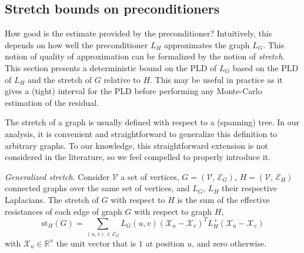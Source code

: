 


\subsection{Stretch bounds on preconditioners\label{sub:Stretch-bounds}}

How good is the estimate provided by the preconditioner? Intuitively,
this depends on how well the preconditioner $L_{H}$ approximates
the graph $L_{G}$. This notion of quality of approximation can be
formalized by the notion of \emph{stretch}. This section presents
a deterministic bound on the PLD of $L_{G}$ based on the PLD of $L_{H}$
and the stretch of $G$ relative to $H$. This may be useful in practice
as it gives a (tight) interval for the PLD before performing any Monte-Carlo
estimation of the residual.

The stretch of a graph is usually defined with respect to a (spanning)
tree. In our analysis, it is convenient and straightforward to generalize
this definition to arbitrary graphs. To our knowledge, this straightforward
extension is not considered in the literature, so we feel compelled
to properly introduce it. 
\begin{definition}
\emph{Generalized stretch}.\label{Generalized-stretch} Consider $\mathcal{V}$
a set of vertices, $G=\left(\mathcal{V},\,\mathcal{E}_{G}\right),\, H=\left(\mathcal{V},\,\mathcal{E}_{H}\right)$
connected graphs over the same set of vertices, and $L_{G}$, $L_{H}$
their respective Laplacians. The stretch of $G$ with respect to $H$
is the sum of the effective resistances of each edge of graph $G$
with respect to graph $H$, 
\[
\text{st}_{H}\left(G\right)=\sum_{\left(u,v\right)\in\mathcal{E}_{G}}L_{G}\left(u,v\right)\left(\mathcal{X}_{u}-\mathcal{X}_{v}\right)^{T}L_{H}^{+}\left(\mathcal{X}_{u}-\mathcal{X}_{v}\right)
\]
with $\mathcal{X}_{u}\in\mathbb{R}^{n}$ the unit vector that is $1$
at position $u$, and zero otherwise. 
\end{definition}

